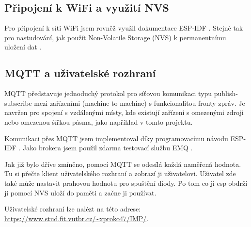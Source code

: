 \documentclass[a4paper, 11pt]{article}
\begin{document}
        \subsection{Připojení k WiFi a využití NVS}
            Pro připojení k síti WiFi jsem rovněž využil dokumentace ESP-IDF \cite{wifi}.
            Stejně tak pro nastudování, jak použít Non-Volatile Storage (NVS) k permanentnímu uložení dat 
            \cite{nvs_example}.

        \subsection{MQTT a uživatelské rozhraní}
            MQTT představuje jednoduchý protokol pro síťovou komunikaci typu 
            publish-subscribe mezi zařízeními (machine to machine) s funkcionalitou fronty zpráv. Je navržen pro 
            spojení s vzdálenými místy, kde existují zařízení s omezenými zdroji nebo omezenou šířkou pásma, jako 
            například v tomto projektu.

            Komunikaci přes MQTT jsem implementoval díky programovacímu návodu ESP-IDF \cite{mqtt}. Jako brokera jsem použil
            zdarma testovací službu EMQ \cite{mqtt_broker}.

            Jak již bylo dříve zmíněno, pomocí MQTT se odesílá každá naměřená hodnota. 
            Tu si přečte klient
            uživatelského rozhraní a zobrazí ji uživatelovi. Uživatel zde také může nastavit prahovou hodnotu pro
            spuštění diody. Po tom co ji esp obdrží ji pomocí NVS uloží do paměti a začne ji používat.
            
            Uživatelské rozhraní lze nalézt na této adrese: \url{https://www.stud.fit.vutbr.cz/~xproko47/IMP/}.
            
        \newpage
	
	\renewcommand{\refname}{Literatura}
	
\end{document}
